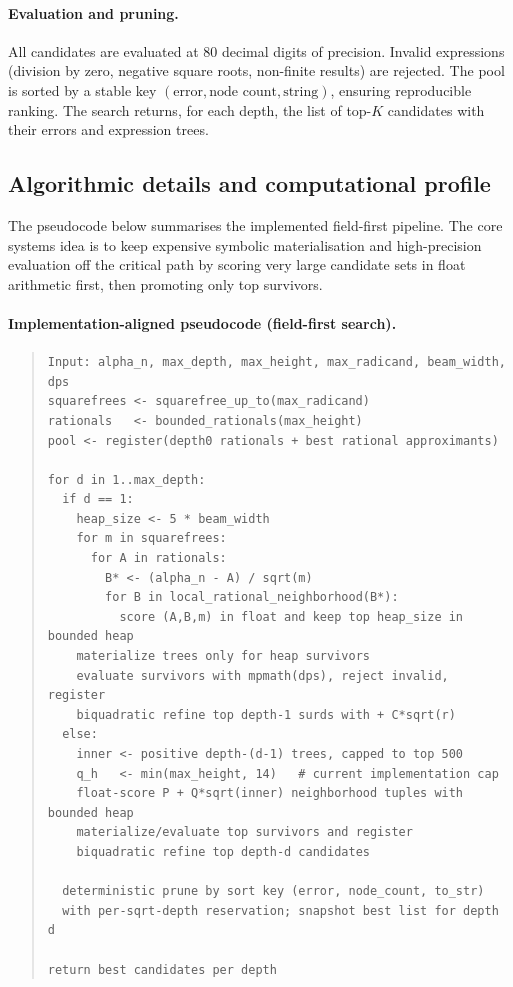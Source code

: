 \documentclass[11pt]{article}
\begin{document}
\paragraph{Evaluation and pruning.}
All candidates are evaluated at $80$ decimal digits of precision.
Invalid expressions (division by zero, negative square roots, non-finite results) are rejected.
The pool is sorted by a stable key \((\text{error}, \text{node count}, \text{string})\), ensuring reproducible ranking.
The search returns, for each depth, the list of top-$K$ candidates with their errors and expression trees.

\subsection{Algorithmic details and computational profile}

The pseudocode below summarises the implemented field-first pipeline.
The core systems idea is to keep expensive symbolic materialisation and high-precision evaluation off the critical path by scoring very large candidate sets in float arithmetic first, then promoting only top survivors.

\paragraph{Implementation-aligned pseudocode (field-first search).}
\begin{quote}\small
\begin{verbatim}
Input: alpha_n, max_depth, max_height, max_radicand, beam_width, dps
squarefrees <- squarefree_up_to(max_radicand)
rationals   <- bounded_rationals(max_height)
pool <- register(depth0 rationals + best rational approximants)

for d in 1..max_depth:
  if d == 1:
    heap_size <- 5 * beam_width
    for m in squarefrees:
      for A in rationals:
        B* <- (alpha_n - A) / sqrt(m)
        for B in local_rational_neighborhood(B*):
          score (A,B,m) in float and keep top heap_size in bounded heap
    materialize trees only for heap survivors
    evaluate survivors with mpmath(dps), reject invalid, register
    biquadratic refine top depth-1 surds with + C*sqrt(r)
  else:
    inner <- positive depth-(d-1) trees, capped to top 500
    q_h   <- min(max_height, 14)   # current implementation cap
    float-score P + Q*sqrt(inner) neighborhood tuples with bounded heap
    materialize/evaluate top survivors and register
    biquadratic refine top depth-d candidates

  deterministic prune by sort key (error, node_count, to_str)
  with per-sqrt-depth reservation; snapshot best list for depth d

return best candidates per depth
\end{verbatim}
\end{quote}
\end{document}
